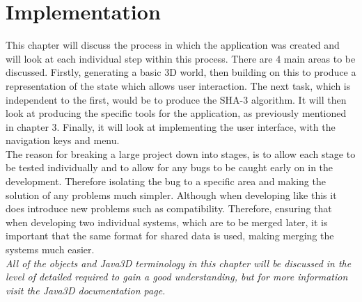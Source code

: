 \chapter{Implementation}
This chapter will discuss the process in which the application was created and will look at each individual step within this process. There are 4 main areas to be discussed. Firstly, generating a basic 3D world, then building on this to produce a representation of the state which allows user interaction. The next task, which is independent to the first, would be to produce the SHA-3 algorithm. It will then look at producing the specific tools for the application, as previously mentioned in chapter 3. Finally, it will look at implementing the user interface, with the navigation keys and menu.
\vspace{5mm}\\
The reason for breaking a large project down into stages, is to allow each stage to be tested individually and to allow for any bugs to be caught early on in the development. Therefore isolating the bug to a specific area and making the solution of any problems much simpler. Although when developing like this it does introduce new problems such as compatibility. Therefore, ensuring that when developing two individual systems, which are to be merged later, it is important that the same format for shared data is used, making merging the systems much easier.
\vspace{5mm}\\
\textit{All of the objects and Java3D terminology in this chapter will be discussed in the level of detailed required to gain a good understanding, but for more information visit the Java3D documentation page\cite{Java3dDoc}.}
\vspace{10mm}\\
